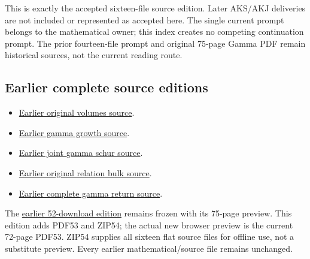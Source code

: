 \documentclass[
]{article}
\providecommand{\tightlist}{%
  \setlength{\itemsep}{0pt}\setlength{\parskip}{0pt}}
\begin{document}
This is exactly the accepted sixteen-file source edition. Later AKS/AKJ
deliveries are not included or represented as accepted here. The single
current prompt belongs to the mathematical owner; this index creates no
competing continuation prompt. The prior fourteen-file prompt and
original 75-page Gamma PDF remain historical sources, not the current
reading route.

\subsection{Earlier complete source
editions}\label{earlier-complete-source-editions-4}

\begin{itemize}
\tightlist
\item
  \href{https://github.com/KokunoYumeto/zeta-function-research-reader/tree/1c8ec52c85c173adc9f8403a8a26914955e2f5a9/workbenches/splitzero-tandem/continuations/20260914-original-volumes}{Earlier
  original volumes source}.
\item
  \href{https://github.com/KokunoYumeto/zeta-function-research-reader/tree/41f020e0475429943252e69a1b4edd849393c780/workbenches/splitzero-tandem/continuations/20260914-gamma-growth}{Earlier
  gamma growth source}.
\item
  \href{https://github.com/KokunoYumeto/zeta-function-research-reader/tree/2be3b23974bf040f4ea06240b8a4b85372f7c71d/workbenches/splitzero-tandem/continuations/20260914-joint-gamma-schur}{Earlier
  joint gamma schur source}.
\item
  \href{https://github.com/KokunoYumeto/zeta-function-research-reader/tree/01fc8820e3a3ea69afa22b8ab1b0b5ca61869456/workbenches/splitzero-tandem/continuations/20260914-original-relation-bulk}{Earlier
  original relation bulk source}.
\item
  \href{https://github.com/KokunoYumeto/zeta-function-research-reader/tree/01fc8820e3a3ea69afa22b8ab1b0b5ca61869456/workbenches/splitzero-tandem/continuations/20260914-complete-gamma-return}{Earlier
  complete gamma return source}.
\end{itemize}

The \href{https://doi.org/10.5281/zenodo.22757268}{earlier 52-download
edition} remains frozen with its 75-page preview. This edition adds
PDF53 and ZIP54; the actual new browser preview is the current 72-page
PDF53. ZIP54 supplies all sixteen flat source files for offline use, not
a substitute preview. Every earlier mathematical/source file remains
unchanged.
\end{document}
